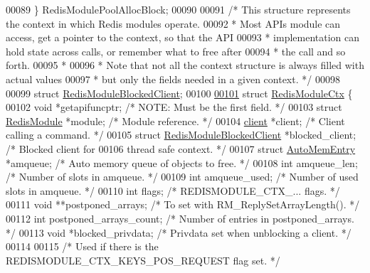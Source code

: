 \begin{DoxyCode}
00089 \} RedisModulePoolAllocBlock;
00090 
00091 \textcolor{comment}{/* This structure represents the context in which Redis modules operate.}
00092 \textcolor{comment}{ * Most APIs module can access, get a pointer to the context, so that the API}
00093 \textcolor{comment}{ * implementation can hold state across calls, or remember what to free after}
00094 \textcolor{comment}{ * the call and so forth.}
00095 \textcolor{comment}{ *}
00096 \textcolor{comment}{ * Note that not all the context structure is always filled with actual values}
00097 \textcolor{comment}{ * but only the fields needed in a given context. */}
00098 
00099 \textcolor{keyword}{struct} \hyperlink{structRedisModuleBlockedClient}{RedisModuleBlockedClient};
00100 
\hyperlink{structRedisModuleCtx}{00101} \textcolor{keyword}{struct} \hyperlink{structRedisModuleCtx}{RedisModuleCtx} \{
00102     \textcolor{keywordtype}{void} *getapifuncptr;            \textcolor{comment}{/* NOTE: Must be the first field. */}
00103     \textcolor{keyword}{struct} \hyperlink{structRedisModule}{RedisModule} *module;     \textcolor{comment}{/* Module reference. */}
00104     \hyperlink{structclient}{client} *client;                 \textcolor{comment}{/* Client calling a command. */}
00105     \textcolor{keyword}{struct} \hyperlink{structRedisModuleBlockedClient}{RedisModuleBlockedClient} *blocked\_client; \textcolor{comment}{/* Blocked client for}
00106 \textcolor{comment}{                                                        thread safe context. */}
00107     \textcolor{keyword}{struct} \hyperlink{structAutoMemEntry}{AutoMemEntry} *amqueue;   \textcolor{comment}{/* Auto memory queue of objects to free. */}
00108     \textcolor{keywordtype}{int} amqueue\_len;                \textcolor{comment}{/* Number of slots in amqueue. */}
00109     \textcolor{keywordtype}{int} amqueue\_used;               \textcolor{comment}{/* Number of used slots in amqueue. */}
00110     \textcolor{keywordtype}{int} flags;                      \textcolor{comment}{/* REDISMODULE\_CTX\_... flags. */}
00111     \textcolor{keywordtype}{void} **postponed\_arrays;        \textcolor{comment}{/* To set with RM\_ReplySetArrayLength(). */}
00112     \textcolor{keywordtype}{int} postponed\_arrays\_count;     \textcolor{comment}{/* Number of entries in postponed\_arrays. */}
00113     \textcolor{keywordtype}{void} *blocked\_privdata;         \textcolor{comment}{/* Privdata set when unblocking a client. */}
00114 
00115     \textcolor{comment}{/* Used if there is the REDISMODULE\_CTX\_KEYS\_POS\_REQUEST flag set. */}

\end{DoxyCode}
